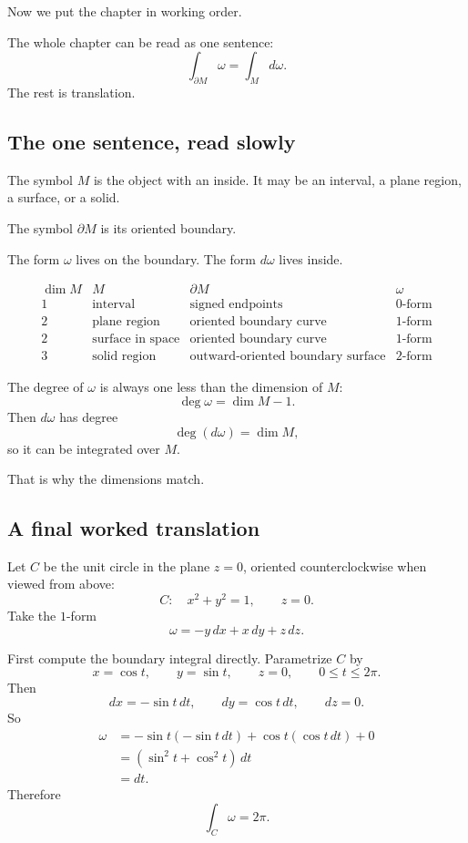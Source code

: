 Now we put the chapter in working order.

The whole chapter can be read as one sentence:
\[
\boxed{
    \int_{\partial M}\omega=\int_M d\omega.
}
\]
The rest is translation.

\subsection{The one sentence, read slowly}

The symbol \(M\) is the object with an inside.  It may be an interval, a plane region,
a surface, or a solid.

The symbol \(\partial M\) is its oriented boundary.

The form \(\omega\) lives on the boundary.  The form \(d\omega\) lives inside.

\[
\begin{array}{c|c|c|c}
\dim M & M & \partial M & \omega \\ \hline
1 & \text{interval} & \text{signed endpoints} & 0\text{-form}\\[1mm]
2 & \text{plane region} & \text{oriented boundary curve} & 1\text{-form}\\[1mm]
2 & \text{surface in space} & \text{oriented boundary curve} & 1\text{-form}\\[1mm]
3 & \text{solid region} & \text{outward-oriented boundary surface} & 2\text{-form}
\end{array}
\]

The degree of \(\omega\) is always one less than the dimension of \(M\):
\[
    \deg \omega=\dim M-1.
\]
Then \(d\omega\) has degree
\[
    \deg(d\omega)=\dim M,
\]
so it can be integrated over \(M\).

That is why the dimensions match.

\subsection{A final worked translation}

Let \(C\) be the unit circle in the plane \(z=0\), oriented counterclockwise when viewed
from above:
\[
    C:\quad x^2+y^2=1,\qquad z=0.
\]
Take the \(1\)-form
\[
    \omega=-y\,dx+x\,dy+z\,dz.
\]

First compute the boundary integral directly.  Parametrize \(C\) by
\[
    x=\cos t,\qquad y=\sin t,\qquad z=0,
    \qquad 0\le t\le 2\pi.
\]
Then
\[
    dx=-\sin t\,dt,
    \qquad
    dy=\cos t\,dt,
    \qquad
    dz=0.
\]
So
\[
\begin{aligned}
    \omega
    &=
    -\sin t(-\sin t\,dt)+\cos t(\cos t\,dt)+0\\
    &=
    (\sin^2 t+\cos^2 t)\,dt\\
    &=
    dt.
\end{aligned}
\]
Therefore
\[
\boxed{
    \int_C\omega=2\pi.
}
\]

